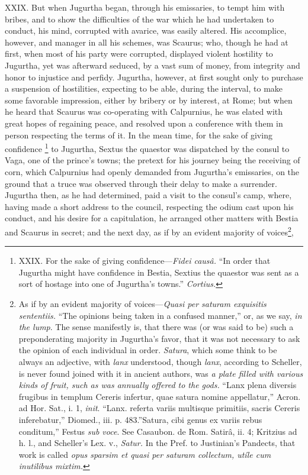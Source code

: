 XXIX. But when Jugurtha began, through his emissaries, to tempt him
with bribes, and to show the difficulties of the war which he had
undertaken to conduct, his mind, corrupted with avarice, was easily
altered. His accomplice, however, and manager in all his schemes, was
Scaurus; who, though he had at first, when most of his party were
corrupted, displayed violent hostility to Jugurtha, yet was afterward
seduced, by a vast sum of money, from integrity and honor to injustice
and perfidy. Jugurtha, however, at first sought only to purchase a
suspension of hostilities, expecting to be able, during the interval,
to make some favorable impression, either by bribery or by interest,
at Rome; but when he heard that Scaurus was co-operating with
Calpurnius, he was elated with great hopes of regaining peace, and
resolved upon a conference with them in person respecting the terms of
it. In the mean time, for the sake of giving confidence \footnote{XXIX. For the sake of giving confidence—\emph{Fidei causâ.} ``In
order that Jugurtha might have confidence in Bestia, Sextius the
quaestor was sent as a sort of hostage into one of Jugurtha's towns.''
\emph{Cortius.}} to
Jugurtha, Sextus the quaestor was dispatched by the consul to Vaga,
one of the prince's towns; the pretext for his journey being the
receiving of corn, which Calpurnius had openly demanded from Jugurtha's
emissaries, on the ground that a truce was observed through their delay
to make a surrender. Jugurtha then, as he had determined, paid a visit
to the consul's camp, where, having made a short address to the council,
respecting the odium cast upon his conduct, and his desire for a
capitulation, he arranged other matters with Bestia and Scaurus in
secret; and the next day, as if by an evident majority of voices\footnote{As if by an evident majority of voices—\emph{Quasi per saturam
exquisitis sententiis.} ``The opinions being taken in a confused
manner,'' or, as we say, \emph{in the lump}. The sense manifestly is, that
there was (or was said to be) such a preponderating majority in
Jugurtha's favor, that it was not necessary to ask the opinion of each
individual in order. \emph{Satura}, which some think to be always an
adjective, with \emph{lanx} understood, though \emph{lanx}, according to
Scheller, is never found joined with it in ancient authors, was \emph{a
plate filled with various kinds of fruit, such as was annually offered
to the gods.} ``Lanx plena diversis frugibus in templum Cereris
infertur, quae satura nomine appellatur,'' Acron. ad Hor. Sat., i. 1,
\emph{init}. ``Lanx. referta variis multisque primitiis, sacris Cereris
inferebatur,'' Diomed., iii. p. 483.''Satura, cibi genus ex variis rebus
conditum,'' Festus \emph{sub voce}. See Casaubon. de Rom. Satirâ, ii. 4;
Kritzius ad h. l., and Scheller's Lex. v., \emph{Satur.} In the Pref. to
Justinian's Pandects, that work is called \emph{opus sparsim et quasi per
saturam collectum, utíle cum inutilibus mixtim.}},
